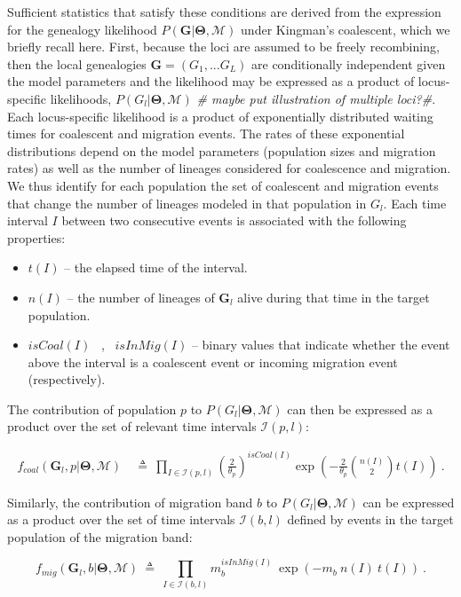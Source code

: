 \documentclass[11pt]{article}
\newcommand{\vect}[1]{\boldsymbol{\mathbf{#1}}}
\newcommand{\M}{\mathcal{M}}
\newcommand{\G}{\vect{G}}
\newcommand{\T}{\vect{\Theta}}
\newcommand{\Ip}{\mathcal{I}(p,l)}
\newcommand{\Ib}{\mathcal{I}(b,l)}
\newcommand{\1}{\mathbbm{1}}
\begin{document}
Sufficient statistics that satisfy these conditions are derived from the expression for the genealogy likelihood $P(\G|\T, \M)$ under Kingman's coalescent, which we briefly recall here.
First, because the loci are assumed to be freely recombining, then the local genealogies $\G=(G_1,...G_L)$ are conditionally independent given the model parameters and the likelihood may be expressed as a product of locus-specific likelihoods, $P(G_l|\T,\M)$ \textit{\# maybe put illustration of multiple loci?\#}.  Each locus-specific likelihood is a product of exponentially distributed waiting times for coalescent and migration events. The rates of these exponential distributions depend on the model parameters (population sizes and migration rates) as well as the number of lineages considered for coalescence and migration. We thus identify for each population the set of coalescent and migration events that change the number of lineages modeled in that population in $G_l$. Each time interval $I$ between two consecutive events is associated with the following properties:
\begin{itemize}
 \item $t(I)$ -- the elapsed time of the interval.
 \item $n(I)$ -- the number of lineages of $\G_l$ alive during that time in the target population.
 \item $isCoal(I)$ ~,~ $isInMig(I)$  -- binary values that indicate whether the event above the interval is a coalescent event or incoming migration event (respectively).
\end{itemize}
%
%
The contribution of population $p$ to $P(G_l|\T,\M)$ can then be expressed as a product over the set of relevant time intervals $\Ip$:
%
%
\begin{small}
\begin{align}
f_{coal}(\G_l,p|\T,\M) 
& ~\triangleq~ \prod_{I \in \Ip} \left(\frac{2}{\theta_p}\right)^{isCoal(I)} \exp\left(-\frac{2}{\theta_p}{n(I) \choose 2}t(I)\right) ~. %
\label{eqn:ld-coal}
\end{align}
\end{small}
%
%
Similarly, the contribution of migration band $b$ to $P(G_l|\T,\M)$ can be expressed as a product over the set of time intervals $\Ib$ defined by events in the target population of the migration band:
%
%
\begin{small}
\begin{equation}
f_{mig}(\G_l,b|\T,\M) ~\triangleq~ \prod_{I \in \Ib} m_{b}^{isInMig(I)} ~ \exp \left( - m_b~ n(I)~t(I)\right) ~.
\label{eqn:ld-mig}
\end{equation}
\end{small}
%
%
\end{document}
